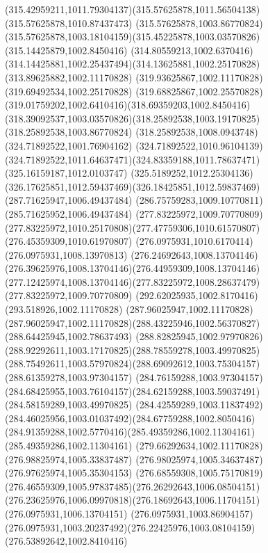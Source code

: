 {{	\curveto(315.42959211,1011.79304137)(315.57625878,1011.56504138)(315.57625878,1010.87437473)
	\lineto(315.57625878,1003.86770824)
	\curveto(315.57625878,1003.18104159)(315.45225878,1003.03570826)(315.14425879,1002.8450416)
	\curveto(314.80559213,1002.6370416)(314.14425881,1002.25437494)(314.13625881,1002.25170828)
	\lineto(313.89625882,1002.11170828)
	\lineto(319.93625867,1002.11170828)
	\lineto(319.69492534,1002.25170828)
	\curveto(319.68825867,1002.25570828)(319.01759202,1002.6410416)(318.69359203,1002.8450416)
	\curveto(318.39092537,1003.03570826)(318.25892538,1003.19170825)(318.25892538,1003.86770824)
	\lineto(318.25892538,1008.0943748)
	\lineto(324.71892522,1001.76904162)
	\lineto(324.71892522,1010.96104139)
	\curveto(324.71892522,1011.64637471)(324.83359188,1011.78637471)(325.16159187,1012.0103747)
	\curveto(325.5189252,1012.25304136)(326.17625851,1012.59437469)(326.18425851,1012.59837469)
	\closepath
	\moveto(287.71625947,1006.49437484)
	\lineto(286.75759283,1009.10770811)
	\lineto(285.71625952,1006.49437484)
	\closepath
	\moveto(277.83225972,1009.70770809)
	\curveto(277.83225972,1010.25170808)(277.47759306,1010.61570807)(276.45359309,1010.61970807)
	\lineto(276.0975931,1010.6170414)
	\lineto(276.0975931,1008.13970813)
	\curveto(276.24692643,1008.13704146)(276.39625976,1008.13704146)(276.44959309,1008.13704146)
	\curveto(277.12425974,1008.13704146)(277.83225972,1008.28637479)(277.83225972,1009.70770809)
	\moveto(292.62025935,1002.8170416)
	\lineto(293.518926,1002.11170828)
	\lineto(287.96025947,1002.11170828)
	\curveto(287.96025947,1002.11170828)(288.43225946,1002.56370827)(288.64425945,1002.78637493)
	\curveto(288.82825945,1002.97970826)(288.92292611,1003.17170825)(288.78559278,1003.49970825)
	\curveto(288.75492611,1003.57970824)(288.69092612,1003.75304157)(288.61359278,1003.97304157)
	\lineto(284.76159288,1003.97304157)
	\curveto(284.68425955,1003.76104157)(284.62159288,1003.59037491)(284.58159289,1003.49970825)
	\curveto(284.42559289,1003.11837492)(284.46025956,1003.01037492)(284.67759288,1002.8050416)
	\curveto(284.91359288,1002.5770416)(285.49359286,1002.11304161)(285.49359286,1002.11304161)
	\lineto(279.66292634,1002.11170828)
	\lineto(276.98825974,1005.33837487)
	\lineto(276.98025974,1005.34637487)
	\lineto(276.97625974,1005.35304153)
	\curveto(276.68559308,1005.75170819)(276.46559309,1005.97837485)(276.26292643,1006.08504151)
	\curveto(276.23625976,1006.09970818)(276.18692643,1006.11704151)(276.0975931,1006.13704151)
	\lineto(276.0975931,1003.86904157)
	\curveto(276.0975931,1003.20237492)(276.22425976,1003.08104159)(276.53892642,1002.8410416)
}}
